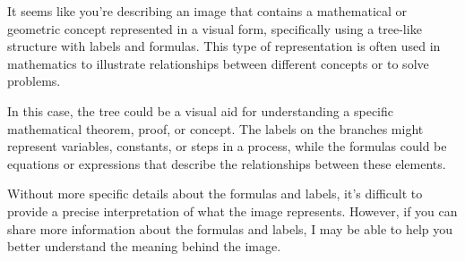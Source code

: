It seems like you're describing an image that contains a mathematical or geometric concept represented in a visual form, specifically using a tree-like structure with labels and formulas. This type of representation is often used in mathematics to illustrate relationships between different concepts or to solve problems.

In this case, the tree could be a visual aid for understanding a specific mathematical theorem, proof, or concept. The labels on the branches might represent variables, constants, or steps in a process, while the formulas could be equations or expressions that describe the relationships between these elements.

Without more specific details about the formulas and labels, it's difficult to provide a precise interpretation of what the image represents. However, if you can share more information about the formulas and labels, I may be able to help you better understand the meaning behind the image.